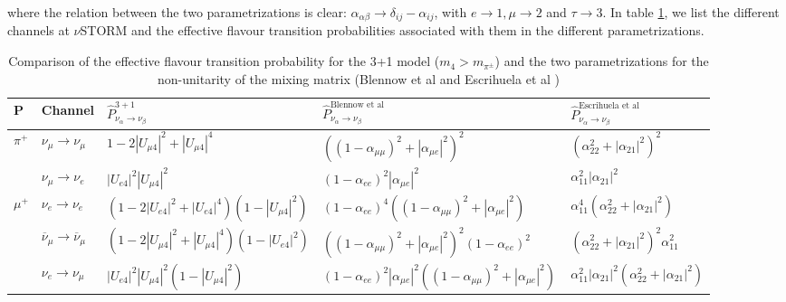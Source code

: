 where the relation between the two parametrizations is clear: $\alpha_{\alpha \beta} \to \delta_{ij} - \alpha_{ij}$, with $e \to 1, \mu \to 2$ and $\tau \to 3$. In table \ref{tab:PeffectiveNuSTORM}, we list the different channels at $\nu$STORM and the effective flavour transition probabilities associated with them in the different parametrizations.
\renewcommand{\arraystretch}{0.4}
\begin{table}[h]
\begin{tabular}{lllll}
P&Channel& $\hat{P}_{\nu_{\alpha} \to \nu_{\beta}}^{3+1}$
& $\hat{P}_{\nu_{\alpha} \to \nu_{\beta}}^{\text{Blennow et al}} $&  $\hat{P}_{\nu_{\alpha} \to \nu_{\beta}}^{\text{Escrihuela et al}}$ \\
%
\hline
%
$\pi^+$ &$\nu_{\mu} \to \nu_{\mu} $&$1 - 2 |U_{\mu 4}|^2 + |U_{\mu 4}|^4 $&$((1-\alpha_{\mu \mu})^2+|\alpha_{\mu e}|^2)^2 $ & $(\alpha_{22}^2+|\alpha_{21}|^2)^2 $\\
%
\cline{2-5}
%
&$\nu_{\mu} \to \nu_{e}$&$|U_{e 4}|^2|U_{\mu 4}|^2$&$ (1-\alpha_{ee})^2|\alpha_{\mu e}|^2 $&$\alpha_{11}^2|\alpha_{21}|^2$\\
 \hline
$\mu^+ $ & $\nu_{e} \to \nu_{e}$&$\left(1 - 2 |U_{e 4}|^2 + |U_{e 4}|^4\right) \left( 1 - |U_{\mu4}|^2\right) $ & $(1-\alpha_{e e})^4 ((1 - \alpha_{\mu \mu})^2 +|\alpha_{\mu e}|^2)$ & $\alpha_{11}^4(\alpha_{22}^2+|\alpha_{21}|^2)$\\
%
\cline{2-5}
%
&$\overline{\nu}_{\mu} \to \overline{\nu}_{\mu}$&$\left(1 - 2 |U_{\mu 4}|^2 + |U_{\mu 4}|^4\right) \left( 1 - |U_{e4}|^2\right)$ & $((1 - \alpha_{\mu \mu})^2 +|\alpha_{\mu e}|^2)^2(1-\alpha_{e e})^2$ & $(\alpha_{22}^2 +|\alpha_{21}|^2)^2\alpha_{11}^2$\\
%
\cline{2-5}
%
&$\nu_{e} \to \nu_{\mu}$ & $|U_{e 4}|^2|U_{\mu 4}|^2\left( 1 - |U_{\mu4}|^2\right)$ & $(1-\alpha_{ee})^2|\alpha_{\mu e}|^2((1 - \alpha_{\mu \mu})^2 +|\alpha_{\mu e}|^2)\,$&$\alpha_{11}^2|\alpha_{21}|^2(\alpha_{22}^2+|\alpha_{21}|^2)$\\
\end{tabular}
\caption{\label{tab:PeffectiveNuSTORM}Comparison of the effective flavour transition probability for the 3+1 model ($m_4 > m_{\pi^{\pm}}$) and the two parametrizations for the non-unitarity of the mixing matrix (Blennow et al \cite{Blennow2016} and Escrihuela et al \cite{Escrihuela2015})}
\end{table}

